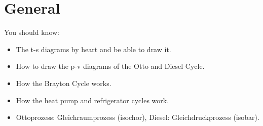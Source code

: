 \section*{General}
You should know:
\begin{itemize}
    \item The t-s diagrams by heart and be able to draw it.
    \item How to draw the p-v diagrams of the Otto and Diesel Cycle.
    \item How the Brayton Cycle works. 
    \item How the heat pump and refrigerator cycles work.
    \item Ottoprozess: Gleichraumprozess (isochor), Diesel: Gleichdruckprozess (isobar).
    
    
\end{itemize}


